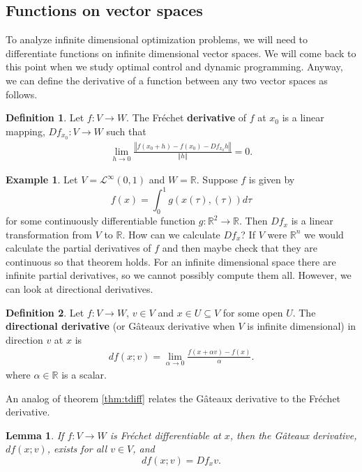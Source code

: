\documentclass[12pt,reqno]{amsart}
\newtheorem{lemma}{Lemma}[section]
\theoremstyle{definition}
\newtheorem{definition}{Definition}[section]
\newtheorem{example}{Example}[section]
\def\R{\mathbb{R}}
\newcommand{\norm}[1]{\left\Vert {#1} \right\Vert}
\renewcommand{\to}{{\rightarrow}}
\begin{document}
\subsection{Functions on vector spaces}
To analyze infinite dimensional optimization problems, we will need to
differentiate functions on infinite dimensional vector spaces. We will
come back to this point when we study optimal control and dynamic
programming. Anyway, we can define the derivative of a function
between any two vector spaces as follows. 
\begin{definition}
  Let $f: V \to W$. The Fr\'{e}chet \textbf{derivative} of $f$ at $x_0$ is a
  linear mapping, $Df_{x_0}: V \to W$ such that
  \begin{align*}
    \lim_{h \to 0} \frac{\left\Vert f(x_0 + h) - f(x_0) - Df_{x_0}
        h\right\Vert} {\norm{h}} = 0. 
  \end{align*}
\end{definition}
\begin{example}\label{ex:fre}
  Let $V = \mathcal{L}^\infty(0,1)$ and $W = \R$. Suppose $f$ is given by
  \[ f(x) = \int_0^1 g(x(\tau),(\tau)) d\tau \] 
  for some continuously differentiable function $g:\R^2 \to
  \R$. 
  Then $Df_{x}$ is a linear transformation from $V$ to $\R$. How
  can we calculate $Df_x$? If $V$ were $\R^n$ we would calculate the
  partial derivatives of $f$ and then maybe check that they are
  continuous so that theorem \label{thm:ptdiff} holds. For an infinite
  dimensional space there are infinite partial derivatives, so we
  cannot possibly compute them all. However, we can look at
  directional derivatives. 
\end{example}
\begin{definition}
  Let $f: V \to W$, $v \in V$ and $x \in U \subseteq V$ for some open
  $U$. The \textbf{directional derivative} (or G\^{a}teaux derivative
  when $V$ is infinite dimensional)  in direction $v$ at $x$ is
  \begin{align*}
    df(x;v) = \lim_{\alpha \to 0} \frac{f(x + \alpha v) - f(x)}{\alpha}.
  \end{align*}  
  where $\alpha \in \R$ is a scalar.
\end{definition}
An analog of theorem \ref{thm:tdiff} relates the G\^{a}teaux
derivative to the Fr\'{e}chet derivative. 
\begin{lemma}\label{lem:fregat}
  If $f: V \to W$ is Fr\'{e}chet differentiable at $x$, then the
  G\^{a}teaux derivative, $df(x;v)$, exists for all $v \in V$, and
  \[ df(x;v) = Df_x v. \]
\end{lemma}
\end{document}
